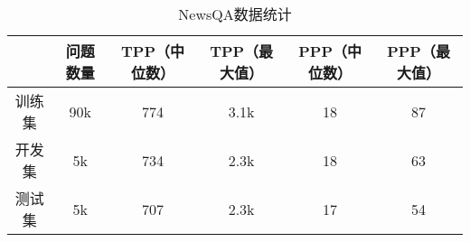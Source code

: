 \begin{table}[htbp]
    \centering
    \caption{NewsQA数据统计}
    \label{tab:2-2}
    \begin{tabular}{cccccc}
        \hline
        & 问题数量 & TPP（中位数） & TPP（最大值） & PPP（中位数）& PPP（最大值） \\
        \hline
        训练集 & 90k & 774 & 3.1k & 18 & 87 \\
        开发集 & 5k & 734 & 2.3k & 18 & 63 \\
        测试集 & 5k & 707 & 2.3k & 17 & 54 \\
        \hline
    \end{tabular}
\end{table}

